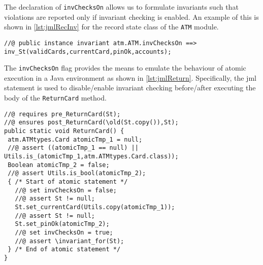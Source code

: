The declaration of \texttt{invChecksOn} allows us to formulate
invariants such that violations are reported only if invariant
checking is enabled. An example of this is shown in
\autoref{lst:jmlRecInv} for the record state class of the \texttt{ATM}
module.

\begin{lstlisting}[style=customJml,caption={The invariant of the record state class.},label={lst:jmlRecInv}]
//@ public instance invariant atm.ATM.invChecksOn ==> inv_St(validCards,currentCard,pinOk,accounts);
\end{lstlisting}

The \texttt{invChecksOn} flag provides the means to emulate the
behaviour of atomic execution in a Java environment as shown in
\autoref{lst:jmlReturn}. Specifically, the \ac{jml}  statement
is used to disable/enable invariant checking before/after executing
the body of the \texttt{ReturnCard} method.

\begin{lstlisting}[style=customJml,caption={Code-generated version
of the \texttt{ReturnCard} operation.},label={lst:jmlReturn}]
//@ requires pre_ReturnCard(St);
//@ ensures post_ReturnCard(\old(St.copy()),St);
public static void ReturnCard() {
 atm.ATMtypes.Card atomicTmp_1 = null;
 //@ assert ((atomicTmp_1 == null) || Utils.is_(atomicTmp_1,atm.ATMtypes.Card.class));
 Boolean atomicTmp_2 = false;
 //@ assert Utils.is_bool(atomicTmp_2);
 { /* Start of atomic statement */
   //@ set invChecksOn = false;
   //@ assert St != null;
   St.set_currentCard(Utils.copy(atomicTmp_1));
   //@ assert St != null;
   St.set_pinOk(atomicTmp_2);
   //@ set invChecksOn = true;
   //@ assert \invariant_for(St);
 } /* End of atomic statement */
}
\end{lstlisting}


